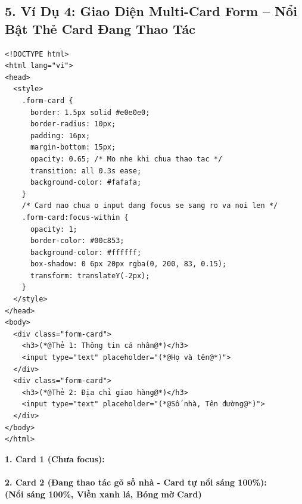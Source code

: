 \subsection{5. Ví Dụ 4: Giao Diện Multi-Card Form -- Nổi Bật Thẻ Card Đang Thao Tác}

\begin{codeWindow}
\begin{lstlisting}[language=HTML5]
<!DOCTYPE html>
<html lang="vi">
<head>
  <style>
    .form-card {
      border: 1.5px solid #e0e0e0;
      border-radius: 10px;
      padding: 16px;
      margin-bottom: 15px;
      opacity: 0.65; /* Mo nhe khi chua thao tac */
      transition: all 0.3s ease;
      background-color: #fafafa;
    }
    /* Card nao chua o input dang focus se sang ro va noi len */
    .form-card:focus-within {
      opacity: 1;
      border-color: #00c853;
      background-color: #ffffff;
      box-shadow: 0 6px 20px rgba(0, 200, 83, 0.15);
      transform: translateY(-2px);
    }
  </style>
</head>
<body>
  <div class="form-card">
    <h3>(*@Thẻ 1: Thông tin cá nhân@*)</h3>
    <input type="text" placeholder="(*@Họ và tên@*)">
  </div>
  <div class="form-card">
    <h3>(*@Thẻ 2: Địa chỉ giao hàng@*)</h3>
    <input type="text" placeholder="(*@Số nhà, Tên đường@*)">
  </div>
</body>
</html>
\end{lstlisting}
\end{codeWindow}

\begin{browserWindow}
\sffamily\small
\textbf{1. Card 1 (Chưa focus):}\\[2pt]
\\[8pt]
\textbf{2. Card 2 (Đang thao tác gõ số nhà - Card tự nổi sáng 100\%):}\\[2pt]
 \quad \textcolor{green!70!black}{\bfseries (Nổi sáng 100\%, Viền xanh lá, Bóng mờ Card)}
\end{browserWindow}

